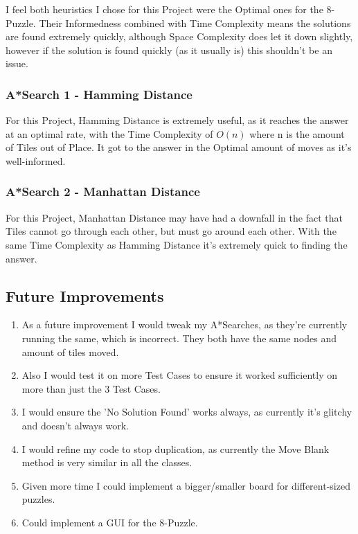 \documentclass[11pt]{article} %
\begin{document}
					I feel both heuristics I chose for this Project were the Optimal ones for the 8-Puzzle. Their Informedness combined with Time Complexity means the solutions are found extremely quickly, although Space Complexity does let it down slightly, however if the solution is found quickly (as it usually is) this shouldn't be an issue. 
	
				\subsubsection{A*Search 1 - Hamming Distance}

					For this Project, Hamming Distance is extremely useful, as it reaches the answer at an optimal rate, with the Time Complexity of \begin{math} O(n) \end{math} where n is the amount of Tiles out of Place. It got to the answer in the Optimal amount of moves as it's well-informed.
	
				\subsubsection{A*Search 2 - Manhattan Distance}

					For this Project, Manhattan Distance may have had a downfall in the fact that Tiles cannot go through each other, but must go around each other. With the same Time Complexity as Hamming Distance it's extremely quick to finding the answer.

	\setlength{\parindent}{15pt} %
	\newpage
				\subsection{Future Improvements}
					\begin{enumerate}

					\item As a future improvement I would tweak my A*Searches, as they're currently running the same, which is incorrect. They both have the same nodes and amount of tiles moved.

					\item Also I would test it on more Test Cases to ensure it worked sufficiently on more than just the 3 Test Cases.

					\item I would ensure the 'No Solution Found' works always, as currently it's glitchy and doesn't always work.

					\item I would refine my code to stop duplication, as currently the Move Blank method is very similar in all the classes.

					\item Given more time I could implement a bigger/smaller board for different-sized puzzles.

					\item Could implement a GUI for the 8-Puzzle.

					\end{enumerate}
\end{document}
